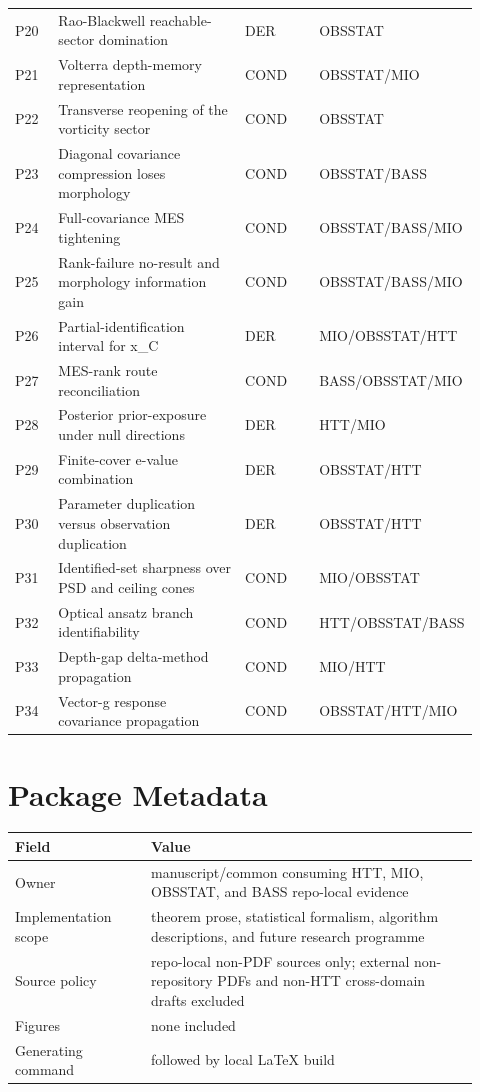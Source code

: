 \documentclass[11pt]{article}
\newcommand{\code}[1]{\texttt{\detokenize{#1}}}
\begin{document}
{\begin{longtable}{>{\raggedright\arraybackslash}p{0.10\linewidth} >{\raggedright\arraybackslash}p{0.50\linewidth} >{\raggedright\arraybackslash}p{0.18\linewidth} >{\raggedright\arraybackslash}p{0.14\linewidth}}
P20 & Rao-Blackwell reachable-sector domination & DER & OBSSTAT\\
P21 & Volterra depth-memory representation & COND & OBSSTAT/\allowbreak{}MIO\\
P22 & Transverse reopening of the vorticity sector & COND & OBSSTAT\\
P23 & Diagonal covariance compression loses morphology & COND & OBSSTAT/\allowbreak{}BASS\\
P24 & Full-covariance MES tightening & COND & OBSSTAT/\allowbreak{}BASS/\allowbreak{}MIO\\
P25 & Rank-failure no-result and morphology information gain & COND & OBSSTAT/\allowbreak{}BASS/\allowbreak{}MIO\\
P26 & Partial-identification interval for x\_C & DER & MIO/\allowbreak{}OBSSTAT/\allowbreak{}HTT\\
P27 & MES-rank route reconciliation & COND & BASS/\allowbreak{}OBSSTAT/\allowbreak{}MIO\\
P28 & Posterior prior-exposure under null directions & DER & HTT/\allowbreak{}MIO\\
P29 & Finite-cover e-value combination & DER & OBSSTAT/\allowbreak{}HTT\\
P30 & Parameter duplication versus observation duplication & DER & OBSSTAT/\allowbreak{}HTT\\
P31 & Identified-set sharpness over PSD and ceiling cones & COND & MIO/\allowbreak{}OBSSTAT\\
P32 & Optical ansatz branch identifiability & COND & HTT/\allowbreak{}OBSSTAT/\allowbreak{}BASS\\
P33 & Depth-gap delta-method propagation & COND & MIO/\allowbreak{}HTT\\
P34 & Vector-g response covariance propagation & COND & OBSSTAT/\allowbreak{}HTT/\allowbreak{}MIO\\
\bottomrule
\end{longtable}
}

\section{Package Metadata}
\begin{longtable}{p{0.27\linewidth}p{0.65\linewidth}}
\toprule
Field & Value\\
\midrule
Owner & manuscript/common consuming HTT, MIO, OBSSTAT, and BASS repo-local evidence\\
Implementation scope & theorem prose, statistical formalism, algorithm descriptions, and future research programme\\
Source policy & repo-local non-PDF sources only; external non-repository PDFs and non-HTT cross-domain drafts excluded\\
Figures & none included\\
Generating command & \code{python scripts/build_external_audit_report_v5.py} followed by local LaTeX build\\
\bottomrule
\end{longtable}
\end{document}
